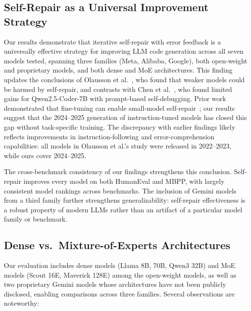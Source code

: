 \documentclass[conference]{IEEEtran}
\begin{document}
\subsection{Self-Repair as a Universal Improvement Strategy}

Our results demonstrate that iterative self-repair with error feedback is a universally effective strategy for improving LLM code generation across all seven models tested, spanning three families (Meta, Alibaba, Google), both open-weight and proprietary models, and both dense and MoE architectures. This finding updates the conclusions of Olausson et al.~\cite{olausson2024selfrepair}, who found that weaker models could be harmed by self-repair, and contrasts with Chen et al.~\cite{chen2025revisit}, who found limited gains for Qwen2.5-Coder-7B with prompt-based self-debugging. Prior work demonstrated that fine-tuning can enable small-model self-repair~\cite{ding2024cycle, jiang2024ledex}; our results suggest that the 2024--2025 generation of instruction-tuned models has closed this gap without task-specific training. The discrepancy with earlier findings likely reflects improvements in instruction-following and error-comprehension capabilities: all models in Olausson et al.'s study were released in 2022--2023, while ours cover 2024--2025.

The cross-benchmark consistency of our findings strengthens this conclusion. Self-repair improves every model on both HumanEval and MBPP, with largely consistent model rankings across benchmarks. The inclusion of Gemini models from a third family further strengthens generalizability: self-repair effectiveness is a robust property of modern LLMs rather than an artifact of a particular model family or benchmark.

\subsection{Dense vs.\ Mixture-of-Experts Architectures}

Our evaluation includes dense models (Llama 8B, 70B, Qwen3 32B) and MoE models (Scout 16E, Maverick 128E) among the open-weight models, as well as two proprietary Gemini models whose architectures have not been publicly disclosed, enabling comparisons across three families. Several observations are noteworthy:
\end{document}
